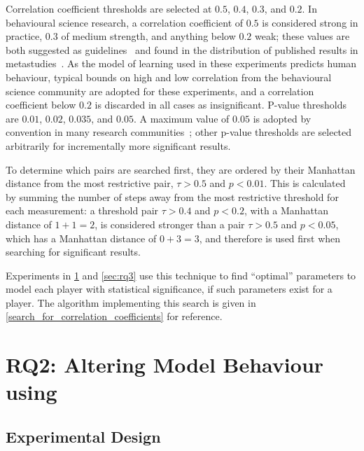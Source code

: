 \label{statistical_significance_thresholds_justified}
Correlation coefficient thresholds are selected at $0.5$, $0.4$, $0.3$, and
$0.2$. In behavioural science research, a correlation coefficient of $0.5$ is
considered strong in practice, $0.3$ of medium strength, and anything below
$0.2$ weak; these values are both suggested as
guidelines~\cite{significant_values_for_correlation_statistics} and found in the
distribution of published results in
metastudies~\cite{interpreting_correlation_coefficient_magnitude_psychology}. As
the model of learning used in these experiments predicts human behaviour,
typical bounds on high and low correlation from the behavioural science
community are adopted for these experiments, and a correlation coefficient below
$0.2$ is discarded in all cases as insignificant. P-value thresholds are $0.01$,
$0.02$, $0.035$, and $0.05$. A maximum value of $0.05$ is adopted by convention
in many research communities~\cite{borderline-significance-statistics-medicine};
other p-value thresholds are selected arbitrarily for incrementally more significant
results.

To determine which pairs are searched first, they are ordered by their Manhattan
distance from the most restrictive pair, $\tau{} > 0.5$ and $p < 0.01$. This is
calculated by summing the number of steps away from the most restrictive
threshold for each measurement: a threshold pair $\tau{} > 0.4$ and $p < 0.2$,
with a Manhattan distance of $1 + 1 = 2$, is considered stronger than a pair
$\tau{} > 0.5$ and $p < 0.05$, which has a Manhattan distance of $0 + 3 = 3$,
and therefore is used first when searching for significant results.

Experiments in \cref{sec:rq2} and \cref{sec:rq3} use this technique to find
``optimal'' parameters to model each player with statistical significance, if
such parameters exist for a player. The algorithm implementing this search is
given in \cref{search_for_correlation_coefficients} for reference.



\section{RQ2: Altering Model Behaviour using \AspectOrientation}
\label{sec:rq2}

\subsection{Experimental Design}


